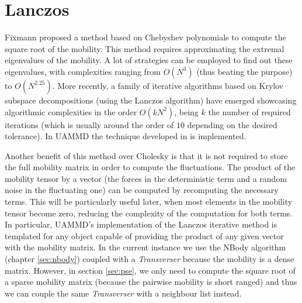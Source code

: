 \documentclass[ twoside,openright,titlepage,numbers=noenddot,%
headinclude,footinclude,cleardoublepage=empty,abstract=on,
BCOR=5mm,paper=a4,fontsize=11pt, dvipsnames
]{scrreprt}
\newcommand{\uammd}{\gls{UAMMD}\xspace}
\begin{document}
\section{Lanczos}\label{sec:lanczos}
Fixmann proposed a method based on Chebyshev polynomials\cite{Fixman1986} to compute the square root of the mobility. This method requires approximating the extremal eigenvalues of the mobility. A lot of strategies can be employed to find out these eigenvalues, with complexities ranging from $O(N^3)$ (thus beating the purpose) to $O(N^{2.25})$\cite{Jendrejack2000}. More recently, a family of iterative algorithms based on Krylov subspace decompositions (using the Lanczos algorithm) have emerged\cite{Ando2012,Saadat2014} showcasing algorithmic complexities in the order $O(kN^2)$, being $k$ the number of required iterations (which is usually around the order of $10$ depending on the desired tolerance). In \uammd the technique developed in \cite{Ando2012} is implemented.

Another benefit of this method over Cholesky is that it is not required to store the full mobility matrix in order to compute the fluctuations. The product of the mobility tensor by a vector (the forces in the deterministic term and a random noise in the fluctuating one) can be computed by recomputing the necessary terms. This will be particularly useful later, when most elements in the mobility tensor become zero, reducing the complexity of the computation for both terms. In particular, \uammd's implementation of the Lanczos iterative method is templated for any object capable of providing the product of any given vector with the mobility matrix. In the current instance we use the NBody algorithm (chapter \ref{sec:nbody}) coupled with a \emph{Transverser} because the mobility is a dense matrix. However, in section \ref{sec:pse}, we only need to compute the square root of a sparse mobility matrix (because the pairwise mobility is short ranged) and thus we can couple the same \emph{Transverser} with a neighbour list instead.


\end{document}
